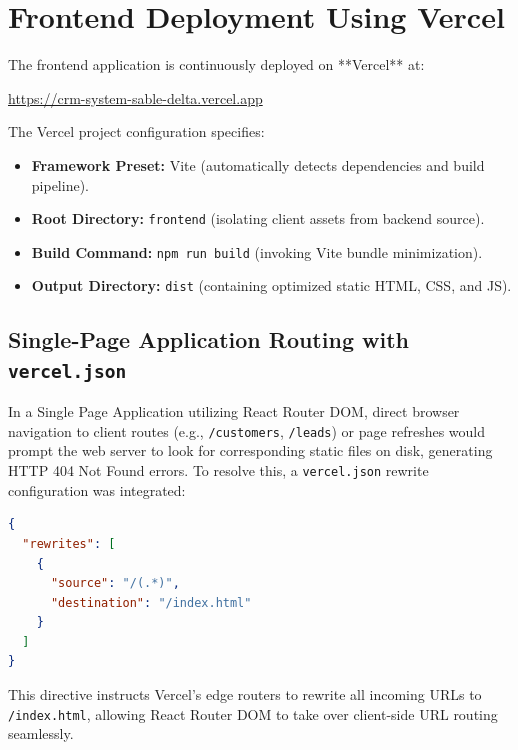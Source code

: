 \section{Frontend Deployment Using Vercel}
The frontend application is continuously deployed on **Vercel** at:
\begin{center}
    \url{https://crm-system-sable-delta.vercel.app}
\end{center}
The Vercel project configuration specifies:
\begin{itemize}
    \item \textbf{Framework Preset:} Vite (automatically detects dependencies and build pipeline).
    \item \textbf{Root Directory:} \texttt{frontend} (isolating client assets from backend source).
    \item \textbf{Build Command:} \texttt{npm run build} (invoking Vite bundle minimization).
    \item \textbf{Output Directory:} \texttt{dist} (containing optimized static HTML, CSS, and JS).
\end{itemize}

\subsection{Single-Page Application Routing with \texttt{vercel.json}}
In a Single Page Application utilizing React Router DOM, direct browser navigation to client routes (e.g., \texttt{/customers}, \texttt{/leads}) or page refreshes would prompt the web server to look for corresponding static files on disk, generating HTTP 404 Not Found errors. To resolve this, a \texttt{vercel.json} rewrite configuration was integrated:

\begin{lstlisting}[language=json, caption={SPA Rewrite Rules in \texttt{frontend/vercel.json}}]
{
  "rewrites": [
    {
      "source": "/(.*)",
      "destination": "/index.html"
    }
  ]
}
\end{lstlisting}
This directive instructs Vercel's edge routers to rewrite all incoming URLs to \texttt{/index.html}, allowing React Router DOM to take over client-side URL routing seamlessly.

